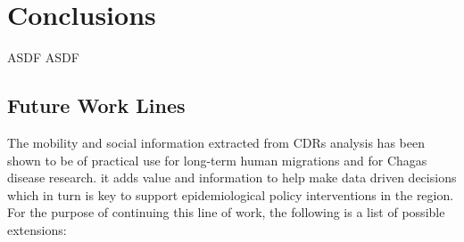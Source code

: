 

%
%



\section{Conclusions}\label{section:conclusions}

ASDF ASDF


\subsection{ Future Work Lines}

The mobility and social information extracted from CDRs analysis has been shown to be of practical use for long-term human migrations and for Chagas disease research.
it adds value and information to help make data driven decisions which in turn is key to support epidemiological policy interventions in the region.
For the purpose of continuing this line of work, the following is a list of possible extensions:

